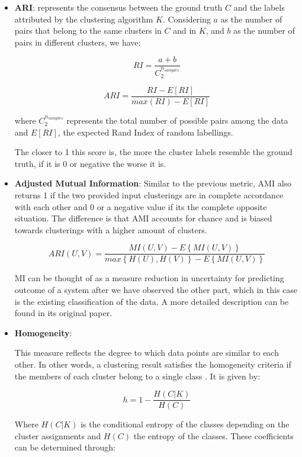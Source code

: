 \begin{itemize}

\medskip
\item \textbf{\gls{ARI}}: \cite{scikitlearn} \cite{hubert1985comparing} represents the consensus between the ground truth $C$ and the labels attributed by the clustering algorithm $K$. Considering $a$ as the number of pairs that belong to the same clusters in $C$ and in $K$, and $b$ as the number of pairs in different clusters, we have:

$$RI = \frac{a+b}{C_{2}^{n_{samples}}}$$

$$ARI = \frac{RI - E\left[RI\right]}{max(RI)-E\left[RI\right]}$$

where $C_{2}^{n_{samples}}$ represents the total number of possible pairs among the data and $E\left[RI\right]$, the expected Rand Index of random labellings.

The closer to 1 this score is, the more the cluster labels resemble the ground truth, if it is 0 or negative the worse it is.

\medskip
\item \textbf{Adjusted Mutual Information}: Similar to the previous metric, AMI also returns 1 if the two provided input clusterings are in complete accordance with each other and 0 or a negative value if its the complete opposite situation. The difference is that AMI accounts for chance and is biased towards clusterings with a higher amount of clusters.

$$ARI(U,V) = \frac{MI(U,V)-E\left\{ MI(U,V) \right\}}{max \left\{ H(U),H(V) \right\} - E\left\{ MI(U,V) \right\}}$$

MI can be thought of as a measure reduction in uncertainty for predicting outcome of a system after we have observed the other part, which in this case is the existing classification of the data. A more detailed description can be found in its original paper. \cite{vinh2010information} \cite{scikitlearn}

\medskip
\item \textbf{Homogeneity}: 
 
This measure reflects the degree to which data points are similar to each other. In other words, a clustering result satisfies the homogeneity criteria if the members of each cluster belong to a single class \cite{rosenberg2007v} \cite{scikitlearn}. It is given by:

$$h = 1 - \frac{H(C|K)}{H(C)}$$

Where $H(C|K)$ is the conditional entropy of the classes depending on the cluster assignments and $H(C)$ the entropy of the classes. These coefficients can be determined through:
 

\end{itemize}
